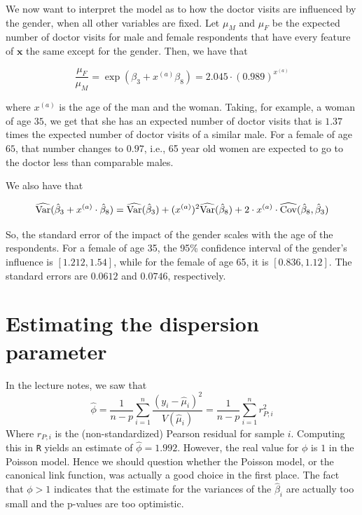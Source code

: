 \documentclass[a4paper,11pt]{article}
\begin{document}
We now want to interpret the model as to how the doctor visits are influenced by the gender, when all other variables are fixed. Let $\mu_M$ and $\mu_F$ be the expected number of doctor visits for male and female respondents that have every feature of $\mathbf{x}$ the same except for the gender. Then, we have that 

\begin{equation}
\frac{\mu_F}{\mu_M} = \exp(\beta_3 + x^{(a)}\beta_8) = 2.045\cdot (0.989)^{x^{(a)}}
\end{equation}

where  $x^{(a)}$ is the age of the man and the woman. Taking, for example, a woman of age $35$, we get that she has an expected number of doctor visits that is $1.37$ times the expected number of doctor visits of a similar male. For a female of age $65$, that number changes to $0.97$, i.e., 65 year old women are expected to go to the doctor less than comparable males.

We also have that 

\begin{equation}
\widehat{\mathrm{Var}}(\hat{\beta}_3 + x^{(a)}\cdot\hat{\beta}_8) = \widehat{\mathrm{Var}}(\hat{\beta}_3) +  (x^{(a)})^2 \widehat{\mathrm{Var}}(\hat{\beta}_8) + 2 \cdot x^{(a)}\cdot \widehat{\mathrm{Cov}}(\hat{\beta}_8, \hat{\beta}_3)
\end{equation}

So, the standard error of the impact of the gender scales with the age of the respondents. For a female of age 35, the 95\% confidence interval of the gender's influence is $[1.212, 1.54]$, while for the female of age 65, it is $[0.836 , 1.12 ]$. The standard errors are $0.0612$ and $0.0746$, respectively.

\section{Estimating the dispersion parameter}
In the lecture notes, we saw that 
\begin{equation}
\widehat{\phi} = \frac{1}{n-p} \sum_{i=1}^n \frac{(y_i- \hat{\mu}_i)^2}{V(\hat{\mu}_i)} = \frac{1}{n-p} \sum_{i=1}^n r_{P;i}^2
\end{equation}
Where $r_{P;i}$ is the (non-standardized) Pearson residual for sample $i$. Computing this in \texttt{R} yields an estimate of $\hat{\phi} = 1.992$. However, the real value for $\phi$ is $1$ in the Poisson model. Hence we should question whether the Poisson model, or the canonical link function, was actually a good choice in the first place. The fact that $\phi > 1$ indicates that the estimate for the variances of the $\hat{\beta}_i$ are actually too small and the p-values are too optimistic.
\end{document}
